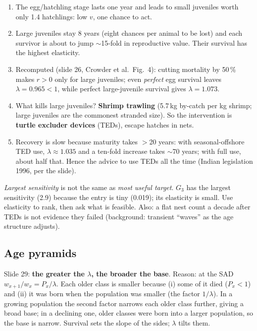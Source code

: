 \begin{chain}
\begin{enumerate}
\item The egg/hatchling stage lasts one year and leads to small juveniles worth only 1.4 hatchlings: low $v$,
one chance to act.
\item Large juveniles stay 8 years (eight chances per animal to be lost) and each survivor is about to jump $\sim$15-fold
in reproductive value. Their survival has the highest elasticity.
\item Recomputed (slide 26, Crowder et al.\ Fig.~4): cutting mortality by 50\,\% makes $r>0$ only for large juveniles;
even \emph{perfect} egg survival leaves $\lambda=0.965<1$, while perfect large-juvenile survival gives $\lambda=1.073$.
\item What kills large juveniles? \textbf{Shrimp trawling} (5.7\,kg by-catch per kg shrimp; large juveniles are the
commonest stranded size). So the intervention is \textbf{turtle excluder devices} (TEDs), escape hatches in nets.
\item Recovery is slow because maturity takes $>$20 years: with seasonal-offshore TED use, $\lambda\approx1.035$ and a
ten-fold increase takes $\sim$70 years; with full use, about half that. Hence the advice to use TEDs all the time
(Indian legislation 1996, per the slide).
\end{enumerate}
\end{chain}

\begin{trap}
\emph{Largest sensitivity} is not the same as \emph{most useful target}. $G_3$ has the largest sensitivity (2.9)
because the entry is tiny (0.019); its elasticity is small. Use elasticity to rank, then ask what is feasible.
Also: a flat nest count a decade after TEDs is not evidence they failed (background: transient ``waves'' as the
age structure adjusts).
\end{trap}

\subsection{Age pyramids}
Slide 29: \textbf{the greater the $\lambda$, the broader the base}. Reason: at the SAD $w_{x+1}/w_x=P_x/\lambda$.
Each older class is smaller because (i) some of it died ($P_x<1$) and (ii) it was born when the population was smaller
(the factor $1/\lambda$). In a growing population the second factor narrows each older class further, giving a broad
base; in a declining one, older classes were born into a larger population, so the base is narrow.
Survival sets the slope of the sides; $\lambda$ tilts them.

